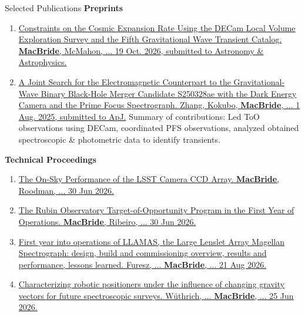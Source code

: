 \begin{rSection}{Selected Publications}
\textbf{Preprints}
\begin{enumerate}
    \item \href{https://arxiv.org/abs/2610.25909}{Constraints on the Cosmic Expansion Rate Using the DECam Local Volume Exploration Survey and the Fifth Gravitational Wave Transient Catalog. \textbf{MacBride}, McMahon, ... 19 Oct. 2026, submitted to Astronomy \& Astrophysics.}
    \item \href{https://arxiv.org/abs/2508.00291}{A Joint Search for the Electromagnetic Counterpart to the Gravitational-Wave Binary Black-Hole Merger Candidate S250328ae with the Dark Energy Camera and the Prime Focus Spectrograph. Zhang, Kokubo, \textbf{MacBride}, ... 1 Aug. 2025, submitted to ApJ.} Summary of contributions: Led \ac{ToO} observations using DECam, coordinated PFS observations, analyzed obtained spectroscopic \& photometric data to identify transients.
\end{enumerate}
    \newpage
\textbf{Technical Proceedings}
\begin{enumerate}
    \item \href{https://arxiv.org/abs/2606.31806}{The On-Sky Performance of the LSST Camera CCD Array. \textbf{MacBride}, Roodman, ... 30 Jun 2026.}
    \item \href{https://arxiv.org/abs/2607.00217}{The Rubin Observatory Target-of-Opportunity Program in the First Year of Operations. \textbf{MacBride}, Ribeiro, ... 30 Jun 2026.}
    \item \href{https://www.spiedigitallibrary.org/conference-proceedings-of-spie/14149/141491L/First-year-of-LLAMAS-the-large-lenslet-array-Magellan-spectrograph/10.1117/12.3104300.short}{First year into operations of LLAMAS, the Large Lenslet Array Magellan Spectrograph: design, build and commissioning overview, results and performance, lessons learned. Furesz, ... \textbf{MacBride}, ... 21 Aug 2026.}
    \item  \href{https://arxiv.org/pdf/2606.26821}{Characterizing robotic positioners under the influence of changing gravity vectors for future spectroscopic surveys. Wüthrich, ... \textbf{MacBride}, ... 25 Jun 2026.}

\end{enumerate}
\end{rSection}
